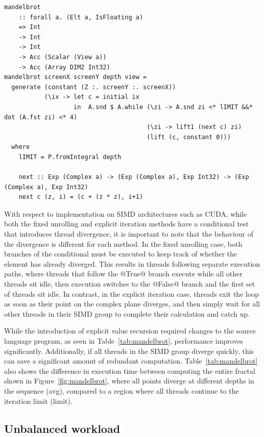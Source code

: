 \begin{lstlisting}[style=haskell_float
    ,label=lst:mandelbrot_loop
    ,caption={Mandelbrot set generator, using explict iteration}]
mandelbrot
    :: forall a. (Elt a, IsFloating a)
    => Int
    -> Int
    -> Int
    -> Acc (Scalar (View a))
    -> Acc (Array DIM2 Int32)
mandelbrot screenX screenY depth view =
  generate (constant (Z :. screenY :. screenX))
           (\ix -> let c = initial ix
                   in  A.snd $ A.while (\zi -> A.snd zi <* lIMIT &&* dot (A.fst zi) <* 4)
                                       (\zi -> lift1 (next c) zi)
                                       (lift (c, constant 0)))
  where
    lIMIT = P.fromIntegral depth

    next :: Exp (Complex a) -> (Exp (Complex a), Exp Int32) -> (Exp (Complex a), Exp Int32)
    next c (z, i) = (c + (z * z), i+1)
\end{lstlisting}

With respect to implementation on SIMD architectures such as CUDA, while both
the fixed unrolling and explicit iteration methods have a conditional test that
introduces thread divergence, it is important to note that the behaviour of the
divergence is different for each method. In the fixed unrolling case, both
branches of the conditional must be executed to keep track of whether the
element has already diverged. This results in threads following separate
execution paths, where threads that follow the @True@ branch execute while all
other threads sit idle, then execution switches to the @False@ branch and the
first set of threads sit idle. In contrast, in the explicit iteration case,
threads exit the loop as soon as their point on the complex plane diverges, and
then simply wait for all other threads in their SIMD group to complete their
calculation and catch up.

While the introduction of explicit value recursion required changes to the
source language program, as seen in Table~\ref{tab:mandelbrot}, performance
improves significantly. Additionally, if all threads in the SIMD group diverge
quickly, this can save a significant amount of redundant computation.
Table~\ref{tab:mandelbrot} also shows the difference in execution time between
computing the entire fractal shown in Figure~\ref{fig:mandelbrot}, where all
points diverge at different depths in the sequence (avg), compared to a region
where all threads continue to the iteration limit (limit).


\subsection{Unbalanced workload}

